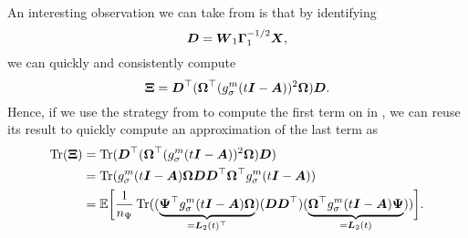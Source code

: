 An interesting observation we can take from 
is that by identifying
\begin{equation}
    \boldsymbol{D} = \boldsymbol{W}_1 \boldsymbol{\Gamma}_1^{-1/2} \boldsymbol{X},
    \label{equ:4-nystromchebyshev-generalized-eigenvector}
\end{equation}
we can quickly and consistently compute
\begin{equation}
    \boldsymbol{\Xi} = \boldsymbol{D}^{\top} (\boldsymbol{\Omega}^{\top} (g_{\sigma}^m(t\boldsymbol{I} - \boldsymbol{A}))^2 \boldsymbol{\Omega}) \boldsymbol{D}.
    \label{equ:4-nystromchebyshev-generalized-eigenvector-xi}
\end{equation}
Hence, if we use the strategy from 
to compute the first term on  in ,
we can reuse its result to quickly compute an approximation of the last term as
\begin{align}
    \operatorname{Tr}(\boldsymbol{\Xi})
    &= \operatorname{Tr}(\boldsymbol{D}^{\top} (\boldsymbol{\Omega}^{\top} (g_{\sigma}^m(t\boldsymbol{I} - \boldsymbol{A}))^2 \boldsymbol{\Omega}) \boldsymbol{D}) \notag \\
    &= \operatorname{Tr}( g_{\sigma}^m(t\boldsymbol{I} - \boldsymbol{A}) \boldsymbol{\Omega} \boldsymbol{D} \boldsymbol{D}^{\top} \boldsymbol{\Omega}^{\top} g_{\sigma}^m(t\boldsymbol{I} - \boldsymbol{A})) \notag \\
    &= \mathbb{E}\bigg[\frac{1}{n_{\Psi}} \operatorname{Tr}( (\underbrace{\boldsymbol{\Psi}^{\top} g_{\sigma}^m(t\boldsymbol{I} - \boldsymbol{A}) \boldsymbol{\Omega}}_{=\boldsymbol{L}_2(t)^{\top}})
                                               (\boldsymbol{D} \boldsymbol{D}^{\top})
                                               (\underbrace{\boldsymbol{\Omega}^{\top} g_{\sigma}^m(t\boldsymbol{I} - \boldsymbol{A}) \boldsymbol{\Psi}}_{=\boldsymbol{L}_2(t)})) \bigg].
    \label{equ:4-nystromchebyshev-generalized-eigenvector-trace}
\end{align}


%
%

